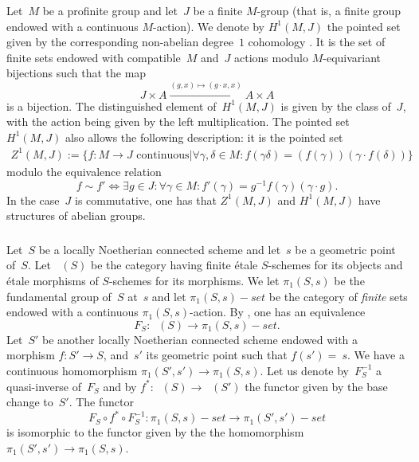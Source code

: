 \documentclass[a4paper,english,12pt]{amsart}
\DeclareMathOperator\et{\acute et}
\numberwithin{equation}{subsection}
\begin{document}
\subsubsection{}Let~$M$ be a profinite group and let~$J$ be a finite $M$-group (that is, a finite group endowed with a continuous $M$-action). We denote by $H^1(M, J)$ the pointed set given by the corresponding non-abelian degree~$1$ cohomology \cite[Chapter I, Section 5.2]{Cohomologiegalois}. It is the set of finite sets endowed with compatible~$M$ and~$J$ actions modulo $M$-equivariant bijections such that the map $$J\times A\xrightarrow{(g,x)\mapsto (g\cdot x,x)} A\times A$$ is a bijection. The distinguished element of~$H^1(M,J)$ is given by the class of~$J$, with the action being given by the left multiplication. %
The pointed set $H^1(M, J)$ also allows the following description: it is the pointed set \begin{align*}Z^1(M,J):=\{f:M\to J\text{ continuous}|\forall\gamma,\delta\in M:f(\gamma\delta)=(f(\gamma))(\gamma\cdot f(\delta))\}
\end{align*} modulo the equivalence relation $$f\sim f'\iff \exists g\in J: \forall \gamma\in M: f'(\gamma)=g^{-1}f(\gamma)(\gamma\cdot g).$$
In the case~$J$ is commutative, one has that $Z^1(M,J)$ and $H^1(M, J)$ have structures of abelian groups.
\subsubsection{}Let~$S$ be a locally Noetherian connected scheme and let~$s$ be a geometric point of~$S$. Let $\et(S)$ be the category having finite \' etale $S$-schemes for its objects and \' etale morphisms of $S$-schemes for its morphisms. We let $\pi_1(S, s)$ be the fundamental group of~$S$ at~$s$ and let $\pi_1(S,s)-set$ be the category of {\it finite} sets endowed with a continuous $\pi_1(S,s)$-action. By \cite[\' Expos\' e V, Section 7]{SGAj}, one has an equivalence $$F_S:\et (S)\to \pi_1(S,s)-set.$$ %
Let~$S'$ be another locally Noetherian connected scheme endowed with a morphism $f:S'\to S$, and~$s'$ its geometric point such that $f(s')=~s$. We have a continuous homomorphism $\pi_1(S', s')\to \pi_1(S,s)$. Let us denote by~$F_S^{-1}$ a quasi-inverse of~$F_S$ and by $f^*:\et(S)\to\et(S')$ the functor given by the base change to~$S'$. The functor $$F_S\circ f^*\circ F_S^{-1}:\pi_1(S,s)-set\to\pi_1(S', s')-set$$ is isomorphic to the functor given by the the homomorphism $\pi_1(S', s')\to \pi_1(S,s)$. 
\end{document}
